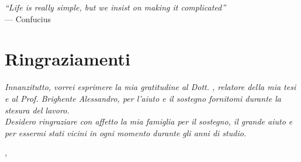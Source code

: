 \cleardoublepage
{}
{}

\begin{flushright}{
    \slshape
    ``Life is really simple, but we insist on making it complicated''} \\
    \medskip
    --- Confucius
\end{flushright}


\bigskip

\begingroup
\let\clearpage\relax
\let\cleardoublepage\relax
\let\cleardoublepage\relax

\chapter*{Ringraziamenti}

\noindent \textit{Innanzitutto, vorrei esprimere la mia gratitudine al Dott. \myProf, relatore della mia tesi e al Prof. Brighente Alessandro, per l'aiuto e il sostegno fornitomi durante la stesura del lavoro.}\\

\noindent \textit{Desidero ringraziare con affetto la mia famiglia per il sostegno, il grande aiuto e per essermi stati vicini in ogni momento durante gli anni di studio.}\\

\bigskip

\noindent\textit{\myLocation, \myTime}
\hfill \myName

\endgroup
